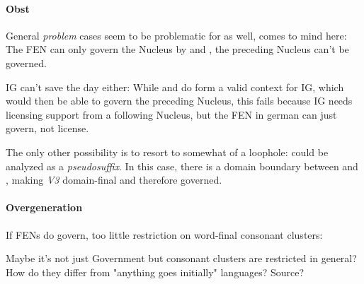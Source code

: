 
\paragraph{Obst}
General \emph{problem} cases seem to be problematic for
\CVCV as well,  %
comes to mind here:
The \gls{FEN} can only govern the Nucleus  by
\ti{[s]} and \ti{[t]}, the preceding Nucleus can't be governed.

\begin{structure}
  \wordstart
  \emptyV
  \emptyV
  \fen
\end{structure}

\gls{IG} can't save the day either:
While \ti{[s]} and \ti{[t]} do form a valid context for \gls{IG},
which would then be able to govern the preceding Nucleus,
this fails because \gls{IG} needs licensing support from a following
Nucleus, but the \gls{FEN} in german can just govern, not license.

The only other possibility is to resort to somewhat of a loophole:
\ti{[st]} could be analyzed as a \emph{pseudosuffix}.
In this case, there is a domain boundary between \ti{[p]}
and \ti{[s]}, making \emph{V3} %
domain-final and therefore governed.


\paragraph{Overgeneration}
If \glspl{FEN} do govern, too little restriction on word-final consonant
clusters:

\ti{*[Sa:fk]}
\begin{structure}
  \wordstart
  \emptyV
  \fen
\end{structure}

Maybe it's not just Government but consonant clusters are restricted
in general? How do they differ from "anything goes initially" languages?
Source?